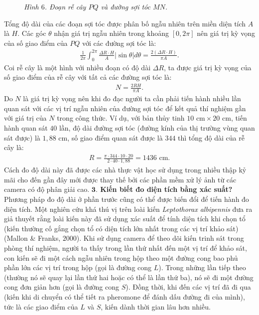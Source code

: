 \begin{multicols}{2}
\begin{figure}[H]
		\caption{\small\textit{\color{toanhocdoisong}Hình $6$. Đoạn rễ cây $PQ$ và đường sợi tóc $MN$.}}
		\vspace*{-10pt}
	\end{figure}
	Tổng độ dài của các đoạn sợi tóc được phân bố ngẫu nhiên trên miền diện tích $A$ là $H$. Các góc $\theta$ nhận giá trị ngẫu nhiên trong khoảng $[0,2\pi]$ nên giá trị kỳ vọng của số giao điểm của $PQ$ với các đường sợi tóc là:
	\begin{align*}
		\frac{1}{2\pi}\int_0^{2\pi}{\frac{{\Delta R \cdot H}}{A}}|\sin\theta|d\theta= \frac{2\left(\Delta R \cdot H\right)}{\pi A}.
	\end{align*}
	Coi rễ cây là một hình với nhiều đoạn có độ dài $\Delta R$, ta được giá trị kỳ vọng của số giao điểm của rễ cây với tất cả các đường sợi tóc là:
	\begin{align*}
		N = \frac{2RH}{\pi A}.
	\end{align*}
	Do $N$ là giá trị kỳ vọng nên khi đo đạc người ta cần phải tiến hành nhiều lần quan sát với các vị trí ngẫu nhiên của đường sợi tóc để kết quả thí nghiệm gần với giá trị của $N$ trong công thức.
	\vskip 0.1cm
	Ví dụ, với bản thủy tinh $10\text{ cm}\times 20\text{ cm}$, tiến hành quan sát $40$ lần, độ dài đường sợi tóc (đường kính của thị trường vùng quan sát được) là $1{,}88$ cm, số giao điểm quan sát được là $344$ thì tổng độ dài của rễ cây là:
	\begin{align*}
		R = \frac{\pi \cdot 344\cdot 10 \cdot 20}{2\cdot40 \cdot1{,}88} = 1436 \text{ cm}.
	\end{align*}
	Cách đo độ dài này đã được các nhà thực vật học sử dụng trong nhiều thập kỷ mãi cho đến gần đây mới được thay thế bởi các phần mềm xử lý ảnh từ các camera có độ phân giải cao.
	\vskip 0.1cm
	\textbf{\color{toanhocdoisong}$\pmb{3.}$ Kiến biết đo diện tích bằng xác suất?}
	\vskip 0.1cm
	Phương pháp đo độ dài ở phần trước cũng có thể được biến đổi để tiến hành đo diện tích.
	\vskip 0.1cm
	Một nghiên cứu khá thú vị trên loài kiến \textit{Leptothorax albipennis} đưa ra giả thuyết rằng loài kiến này đã sử dụng xác suất để tính diện tích khi chọn tổ (kiến thường cố gắng chọn tổ có diện tích lớn nhất trong các vị trí khảo sát) (Mallon \& Franks, $2000$).
	\vskip 0.1cm
	Khi sử dụng camera để theo dõi kiến trinh sát trong phòng thí nghiệm, người ta thấy trong lần thứ nhất đến một vị trí để khảo sát, con kiến sẽ đi một cách ngẫu nhiên trong hộp theo một đường cong bao phủ phần lớn các vị trí trong hộp (gọi là đường cong $L$). Trong những lần tiếp theo (thường nó sẽ quay lại lần thứ hai hoặc có thể là lần thứ ba), nó sẽ đi một đường cong đơn giản hơn (gọi là đường cong $S$). Đồng thời, khi đến các vị trí đã đi qua (kiến khi di chuyển có thể tiết ra pheromone để đánh dấu đường đi của mình), tức là các giao điểm của $L$ và $S$, kiến dành thời gian lâu hơn nhiều.

\end{multicols}
